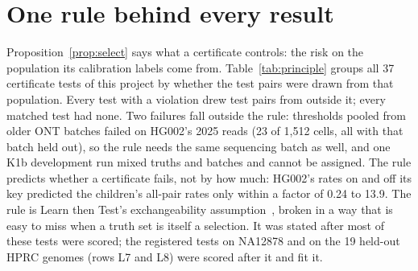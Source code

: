 \documentclass[11pt]{article}
\theoremstyle{definition}
\theoremstyle{remark}
\begin{document}
\section{One rule behind every result}\label{sec:principle}

Proposition~\ref{prop:select} says what a certificate controls: the risk on
the population its calibration labels come from. Table~\ref{tab:principle}
groups all 37 certificate tests of this project by whether the test pairs
were drawn from that population. Every test with a violation drew test
pairs from outside it; every matched test had none. Two failures fall
outside the rule: thresholds pooled from older ONT batches failed on HG002's
2025 reads (23 of 1{,}512 cells, all with that batch held out), so the
rule needs the same sequencing batch as well, and one K1b development run
mixed truths and batches and cannot be assigned. The rule predicts whether
a certificate fails, not by how much: HG002's rates on and off its key
predicted the children's all-pair rates only within a factor of 0.24 to 13.9.
The rule is Learn then Test's exchangeability assumption~\cite{ltt2025},
broken in a way that is easy to miss when a truth set is itself a
selection. It was stated after most of these tests were scored; the
registered tests on NA12878 and on the 19 held-out HPRC genomes (rows L7
and L8) were scored after it and fit it.
\end{document}
